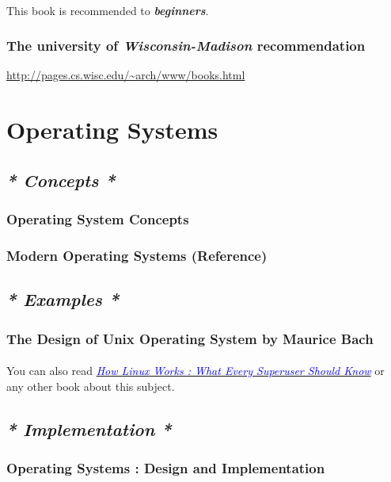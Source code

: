 \documentclass[12pt, a4paper]{article}
\begin{document}
\paragraph{}
This book is recommended to \emph{\textbf{beginners}}.
\subsubsection*{The university of \emph{Wisconsin-Madison} recommendation}
\url{http://pages.cs.wisc.edu/~arch/www/books.html}\\

\section{Operating Systems}
\subsection*{\emph{* Concepts *}}
\subsubsection*{Operating System Concepts}
\subsubsection*{Modern Operating Systems (Reference)}
\subsection*{\emph{* Examples *}}
\subsubsection*{The Design of Unix Operating System by Maurice Bach}
\paragraph{}
You can also read \href{https://nostarch.com/howlinuxworks3}{\emph{\textcolor{blue}{How Linux Works : What Every Superuser Should Know}}} or any other book about this subject.
\subsection*{\emph{* Implementation *}}
\subsubsection*{Operating Systems : Design and Implementation\\}
\end{document}
